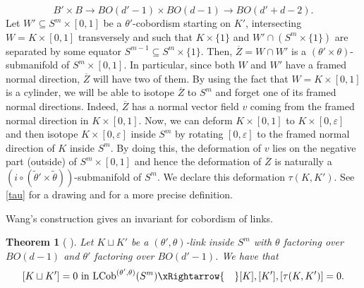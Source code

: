 \documentclass[a4paper, 11pt,reqno]{amsart}
\theoremstyle{plain}
\newtheorem{theorem}{Theorem}[section]
\theoremstyle{definition}
\begin{document}
\[B'\times B\to BO(d'-1)\times BO(d-1)\to BO(d'+d-2).\]
Let $W'\subseteq S^m\times[0,1]$ be a $\theta'$-cobordism starting on $K'$, intersecting $W=K\times[0,1]$ transversely and such that $K\times\{1\}$ and $W'\cap(S^m\times\{1\})$ are separated by some equator $S^{m-1}\subseteq S^m\times\{1\}$. Then, $\overline{Z}=W\cap W'$ is a $(\theta'\times\theta)$-submanifold of $S^m\times[0,1]$. In particular, since both $W$ and $W'$ have a framed normal direction, $\overline{Z}$ will have two of them. By using the fact that $W=K\times[0,1]$ is a cylinder, we will be able to isotope $\overline{Z}$ to $S^m$ and forget one of its framed normal directions. Indeed, $\overline{Z}$ has a normal vector field $v$ coming from the framed normal direction in $K\times[0,1]$. Now, we can deform $K\times[0,1]$ to $K\times[0,\varepsilon]$ and then isotope $K\times[0,\varepsilon]$ inside $S^m$ by rotating $[0,\varepsilon]$ to the framed normal direction of $K$ inside $S^m$. By doing this, the deformation of $v$ lies on the negative part (outside) of $S^m\times[0,1]$ and hence the deformation of $\overline{Z}$ is naturally a $\left(i\circ(\widetilde{\theta}'\times\widetilde{\theta})\right)$-submanifold of $S^m$. We declare this deformation $\tau(K,K')$. See \cref{tau} for a drawing and \cite[Section 4.1]{geohiltonthesis} for a more precise definition.\par
Wang's construction gives an invariant for cobordism of links.
\begin{theorem}[{ \cite{geohiltonthesis}}]\label{invariant}Let $K\sqcup K'$ be a $(\theta',\theta)$-link inside $S^m$ with $\theta$ factoring over $BO(d-1)$ and $\theta'$ factoring over $BO(d'-1)$. We have that 
\[[K\sqcup K']=0\text{ in } \mathrm{LCob}^{(\theta',\theta)}(S^m)\xRightarrow{\quad}[K],[K'],[\tau(K,K')]=0.\]
\end{theorem}
\end{document}
